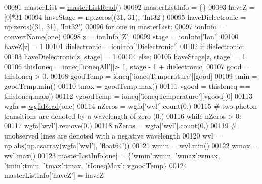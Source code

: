 \begin{DoxyCode}
{00091         masterList = \hyperlink{namespacepyneb_1_1utils_1_1__chianti__tools_a1a4447320a9d614f994bc538890c32cd}{masterListRead}()
00092         masterListInfo = \{\}
00093         haveZ = [0]*31
00094         haveStage = np.zeros((31, 31), \textcolor{stringliteral}{'Int32'})
00095         haveDielectronic = np.zeros((31, 31), \textcolor{stringliteral}{'Int32'})
00096         \textcolor{keywordflow}{for} one \textcolor{keywordflow}{in} masterList:
00097             ionInfo = \hyperlink{namespacepyneb_1_1utils_1_1__chianti__tools_a92cf299ad3407ee8923739e2761ab13f}{convertName}(one)
00098             z = ionInfo[\textcolor{stringliteral}{'Z'}]
00099             stage = ionInfo[\textcolor{stringliteral}{'Ion'}]
00100             haveZ[z] = 1
00101             dielectronic = ionInfo[\textcolor{stringliteral}{'Dielectronic'}]
00102             \textcolor{keywordflow}{if} dielectronic:
00103                 haveDielectronic[z, stage] = 1
00104             \textcolor{keywordflow}{else}:
00105                 haveStage[z, stage] = 1
00106             thisIoneq = ioneq[\textcolor{stringliteral}{'ioneqAll'}][z- 1, stage - 1 + dielectronic]
00107             good = thisIoneq > 0.
00108             goodTemp = ioneq[\textcolor{stringliteral}{'ioneqTemperature'}][good]
00109             tmin = goodTemp.min()
00110             tmax = goodTemp.max()
00111             vgood = thisIoneq == thisIoneq.max()
00112             vgoodTemp = ioneq[\textcolor{stringliteral}{'ioneqTemperature'}][vgood][0]
00113             wgfa = \hyperlink{namespacepyneb_1_1utils_1_1__chianti__tools_a3ef36a1d0a4df4cab94a392d2a3da980}{wgfaRead}(one)
00114             nZeros = wgfa[\textcolor{stringliteral}{'wvl'}].count(0.)
00115             \textcolor{comment}{# two-photon transitions are denoted by a wavelength of zero (0.)}
00116             \textcolor{keywordflow}{while} nZeros > 0:
00117                 wgfa[\textcolor{stringliteral}{'wvl'}].remove(0.)
00118                 nZeros = wgfa[\textcolor{stringliteral}{'wvl'}].count(0.)
00119             \textcolor{comment}{# unobserved lines are denoted with a negative wavelength}
00120             wvl = np.abs(np.asarray(wgfa[\textcolor{stringliteral}{'wvl'}], \textcolor{stringliteral}{'float64'}))
00121             wmin = wvl.min()
00122             wmax = wvl.max()
00123             masterListInfo[one] = \{\textcolor{stringliteral}{'wmin'}:wmin, \textcolor{stringliteral}{'wmax'}:wmax, \textcolor{stringliteral}{'tmin'}:tmin, \textcolor{stringliteral}{'tmax'}:tmax, \textcolor{stringliteral}{'tIoneqMax'}:
      vgoodTemp\}
00124         masterListInfo[\textcolor{stringliteral}{'haveZ'}] = haveZ
}
\end{DoxyCode}
